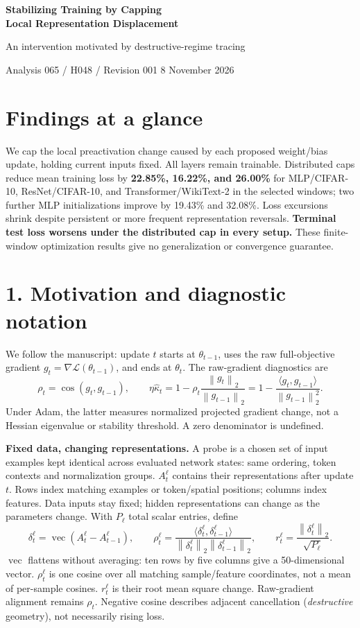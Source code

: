 \documentclass[11pt,a4paper]{article}
\newcommand{\norm}[1]{\left\lVert#1\right\rVert}
\newcommand{\vecop}{\operatorname{vec}}
\newcommand{\sect}[1]{\vspace{2pt}\section*{#1}\vspace{-4pt}}
\begin{document}
\thispagestyle{plain}
{\LARGE\bfseries Stabilizing Training by Capping\\[3pt]
Local Representation Displacement\par}
{\large An intervention motivated by destructive-regime tracing\par}
{\small Analysis 065 / H048 / Revision 001 \hfill 8 November 2026}

\sect{Findings at a glance}
We cap the local preactivation change caused by each proposed weight/bias update,
holding current inputs fixed. All layers remain trainable.
Distributed caps reduce mean training loss by \textbf{22.85\%, 16.22\%, and
26.00\%} for MLP/CIFAR-10, ResNet/CIFAR-10, and Transformer/WikiText-2 in the
selected windows; two further MLP initializations improve by 19.43\% and 32.08\%.
Loss excursions shrink despite persistent or more frequent representation reversals.
\textbf{Terminal test loss worsens under the distributed cap in every setup.}
These finite-window optimization results give no generalization or convergence guarantee.

\sect{1. Motivation and diagnostic notation}
We follow the manuscript: update $t$ starts at $\theta_{t-1}$, uses the raw
full-objective gradient $g_t=\nabla\mathcal L(\theta_{t-1})$, and ends at $\theta_t$.
The raw-gradient diagnostics are
\begin{equation}
 \rho_t=\cos(g_t,g_{t-1}),\qquad
 \eta\widehat\kappa_t=1-\rho_t\frac{\norm{g_t}_2}{\norm{g_{t-1}}_2}
 =1-\frac{\langle g_t,g_{t-1}\rangle}{\norm{g_{t-1}}_2^2}.
 \label{eq:gradient-diagnostics}
\end{equation}
Under Adam, the latter measures normalized projected gradient change, not a
Hessian eigenvalue or stability threshold. A zero denominator is undefined.

\textbf{Fixed data, changing representations.} A probe is a chosen set of input
examples kept identical across evaluated network states: same ordering, token
contexts and normalization groups. $A_t^\ell$ contains their representations
after update $t$. Rows index matching examples or token/spatial positions;
columns index features. Data inputs stay fixed; hidden representations can change
as the parameters change. With $P_\ell$ total scalar entries, define
\begin{equation}
 \delta_t^\ell=\vecop(A_t^\ell-A_{t-1}^\ell),\qquad
 \rho_t^\ell=\frac{\langle\delta_t^\ell,\delta_{t-1}^\ell\rangle}
 {\norm{\delta_t^\ell}_2\norm{\delta_{t-1}^\ell}_2},\qquad
 r_t^\ell=\frac{\norm{\delta_t^\ell}_2}{\sqrt{P_\ell}}.
 \label{eq:trace}
\end{equation}
$\vecop$ flattens without averaging: ten rows by five columns give a
50-dimensional vector. $\rho_t^\ell$ is one cosine over all matching sample/feature
coordinates, not a mean of per-sample cosines. $r_t^\ell$ is their root mean square
change. Raw-gradient alignment remains $\rho_t$. Negative cosine describes
adjacent cancellation (\emph{destructive} geometry), not necessarily rising loss.
\end{document}
